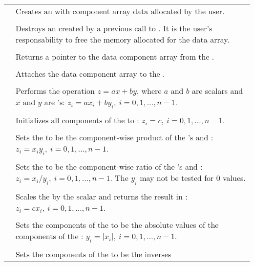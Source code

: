 \begin{supertabular}{|p{\colone}|p{\coltwo}|}
& Creates an  with component array data 
 allocated by the user.
\\
%
 &  \\
& Destroys an  created by a previous call to . 
It is the user's responsability to free the memory allocated for the data array.
\\
%
 &  \\
& Returns a pointer to the data component array from the  .
\\
%
 &  \\
& Attaches the data component array  to the  .
\\
%
 &  \\
& Performs the operation $z = a x + b y$, where $a$ and $b$ are scalars
and $x$ and $y$ are 's:
$z_i = a x_i + b y_i, \: i=0,1,\ldots,n-1$.
\\
%
 &  \\
& Initializes all components of the   to :
$z_i = c,\: i=0,1,\ldots,n-1$.
\\
%
 &  \\
& Sets the   to be the component-wise product of the
's  and :
$z_i = x_i y_i,\: i=0,1,\ldots,n-1$.
\\
%
 &  \\
& Sets the   to be the component-wise ratio of the
's  and :
$z_i = x_i / y_i,\: i=0,1,\ldots,n-1$. The $y_i$ may not be tested 
for $0$ values.
\\
%
 &  \\
& Scales the   by the scalar  and returns
the result in :
$z_i = c x_i , \: i=0,1,\ldots,n-1$.
\\
%
 &  \\
& Sets the components of the   to be the absolute
values of the components of the  :
$y_i = | x_i | , \: i=0,1,\ldots,n-1$.
\\
%
 &  \\
& Sets the components of the   to be the inverses

\end{supertabular}
